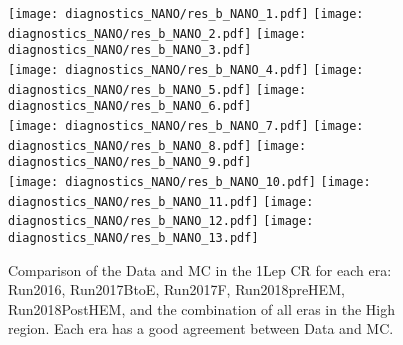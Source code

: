 \begin{figure}[!htb]
	\begin{center}  
  \texttt{[image: diagnostics\_NANO/res\_b\_NANO\_1.pdf]}
  \texttt{[image: diagnostics\_NANO/res\_b\_NANO\_2.pdf]} 
  \texttt{[image: diagnostics\_NANO/res\_b\_NANO\_3.pdf]} \\
  \texttt{[image: diagnostics\_NANO/res\_b\_NANO\_4.pdf]}
  \texttt{[image: diagnostics\_NANO/res\_b\_NANO\_5.pdf]} 
  \texttt{[image: diagnostics\_NANO/res\_b\_NANO\_6.pdf]} \\
  \texttt{[image: diagnostics\_NANO/res\_b\_NANO\_7.pdf]}
  \texttt{[image: diagnostics\_NANO/res\_b\_NANO\_8.pdf]} 
  \texttt{[image: diagnostics\_NANO/res\_b\_NANO\_9.pdf]} \\
  \texttt{[image: diagnostics\_NANO/res\_b\_NANO\_10.pdf]}
  \texttt{[image: diagnostics\_NANO/res\_b\_NANO\_11.pdf]} 
  \texttt{[image: diagnostics\_NANO/res\_b\_NANO\_12.pdf]}     
  \texttt{[image: diagnostics\_NANO/res\_b\_NANO\_13.pdf]} \\ 
	\end{center}
	\caption{Comparison of the Data and MC in the 1Lep CR for each era: Run2016, Run2017BtoE, Run2017F, Run2018preHEM, Run2018PostHEM, and the combination of all eras in the High \dm{} region. Each era has a good agreement between Data and MC. 
	 }
	\label{fig:qcd-1lcr-datavsmc-hm-inclusive}
\end{figure}
